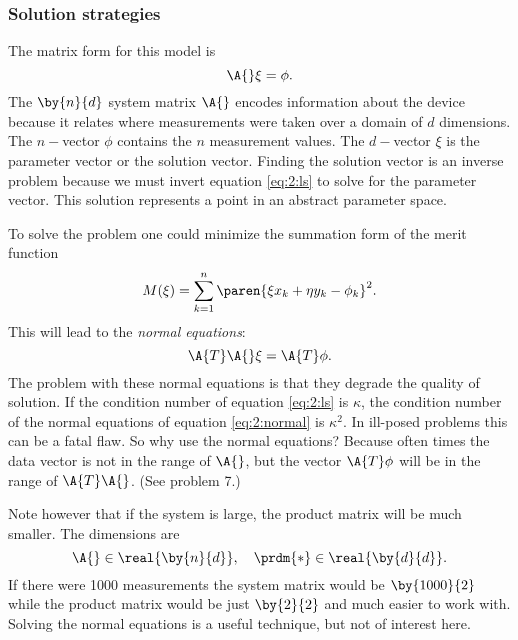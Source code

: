 \subsubsection{Solution strategies}
The matrix form for this model is
\begin{equation}
  \A{}\xi = \phi.
  \label{eq:2:ls}
\end{equation}
The $\by{n}{d}$ system  matrix $\A{}$ encodes information about the device because it relates where measurements were taken over a domain of $d$ dimensions. The $n-$vector $\phi$ contains the $n$ measurement values. The $d-$vector $\xi$ is the parameter vector or the solution vector. Finding the solution vector is an inverse problem because we must invert equation \eqref{eq:2:ls} to solve for the parameter vector. This solution represents a point in an abstract parameter space.

To solve the problem one could minimize the summation form of the merit function 
\begin{equation}
M(\xi)=\sum_{k=1}^{n}{\paren{\xi x_{k} + \eta y_{k} - \phi_{k}}}^{2}.
\end{equation}
This will lead to the \textit{normal equations}:
\begin{equation}
  \A{T}\A{}\xi = \A{T} \phi.
  \label{eq:2:normal}
\end{equation}
The problem with these normal equations is that they degrade the quality of solution. If the condition number of equation \eqref{eq:2:ls} is $\kappa$, the condition number of the normal equations of equation \eqref{eq:2:normal} is $\kappa^{2}$. In ill-posed problems this can be a fatal flaw. So why use the normal equations? Because often times the data vector is not in the range of $\A{}$, but the vector $\A{T}\phi$ will be in the range of $\A{T}\A{}$. (See problem 7.)

Note however that if the system is large, the product matrix will be much smaller. The dimensions are
\begin{equation}
  \A{} \in \real{\by{n}{d}}, \quad \prdm{*} \in \real{\by{d}{d}}.
\end{equation}
If there were 1000 measurements the system matrix would be $\by{1000}{2}$ while the product matrix would be just $\by{2}{2}$ and much easier to work with. Solving the normal equations is a useful technique, but not of interest here.

